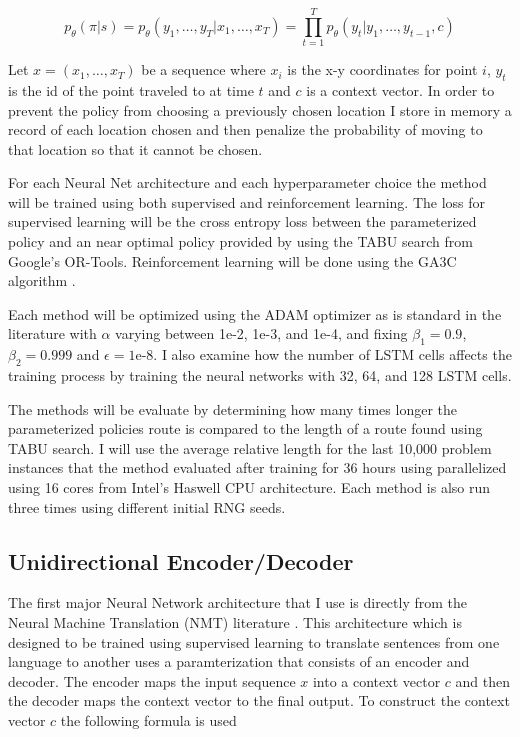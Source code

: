 \documentclass[12pt]{article}
\begin{document}
\begin{equation*}
  p_\theta(\pi|s)=p_\theta(y_1,\dots,y_T |x_1,\dots, x_T)=\prod_{t=1}^{T}p_\theta(y_t|y_1,\dots,y_{t-1},c)
\end{equation*}

Let $x=(x_1,\dots,x_T)$ be a sequence where $x_i$ is the x-y coordinates for point $i$, $y_t$ is the id of the point traveled to at time $t$ and $c$ is a context vector. In order to prevent the policy from choosing a previously chosen location I store in memory a record of each location chosen and then penalize the probability of moving to that location so that it cannot be chosen.

For each Neural Net architecture and each hyperparameter choice the method will be trained using both supervised and reinforcement learning. The loss for supervised learning will be the cross entropy loss between the parameterized policy and an near optimal policy provided by using the TABU search from Google's OR-Tools. Reinforcement learning will be done using the GA3C algorithm \citet{2016_ga3c}.

Each method will be optimized using the ADAM optimizer as is standard in the literature with $\alpha$ varying between 1e-2, 1e-3, and 1e-4, and fixing $\beta_1=0.9$, $\beta_2=0.999$ and $\epsilon=\text{1e-8}$. I also examine how the number of LSTM cells affects the training process by training the neural networks with 32, 64, and 128 LSTM cells.

The methods will be evaluate by determining how many times longer the parameterized policies route is compared to the length of a route found using TABU search. I will use the average relative length for the last 10,000 problem instances that the method evaluated after training for 36 hours using parallelized using 16 cores from Intel's Haswell CPU architecture. Each method is also run three times using different initial RNG seeds.

\subsection{Unidirectional Encoder/Decoder}

The first major Neural Network architecture that I use is directly from the Neural Machine Translation (NMT) literature \citep{2014_sut}. This architecture which is designed to be trained using supervised learning to translate sentences from one language to another uses a paramterization that consists of an encoder and decoder. The encoder maps the input sequence $x$ into a context vector $c$ and then the decoder maps the context vector to the final output. To construct the context vector $c$ the following formula is used
\end{document}
